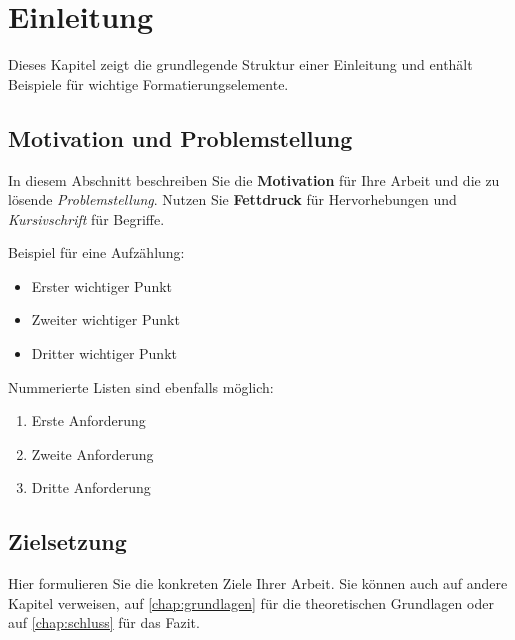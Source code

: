 
\chapter{Einleitung}
\label{chap:einleitung}


Dieses Kapitel zeigt die grundlegende Struktur einer Einleitung und enthält Beispiele für wichtige Formatierungselemente.

\section{Motivation und Problemstellung}
\label{sec:motivation}

In diesem Abschnitt beschreiben Sie die \textbf{Motivation} für Ihre Arbeit und die zu lösende \textit{Problemstellung}. Nutzen Sie \textbf{Fettdruck} für Hervorhebungen und \textit{Kursivschrift} für Begriffe.

Beispiel für eine Aufzählung:
\begin{itemize}
    \item Erster wichtiger Punkt
    \item Zweiter wichtiger Punkt
    \item Dritter wichtiger Punkt
\end{itemize}

Nummerierte Listen sind ebenfalls möglich:
\begin{enumerate}
    \item Erste Anforderung
    \item Zweite Anforderung
    \item Dritte Anforderung
\end{enumerate}

\section{Zielsetzung}
\label{sec:zielsetzung}

Hier formulieren Sie die konkreten Ziele Ihrer Arbeit. Sie können auch auf andere Kapitel verweisen, \zB auf \autoref{chap:grundlagen} für die theoretischen Grundlagen oder auf \autoref{chap:schluss} für das Fazit.

